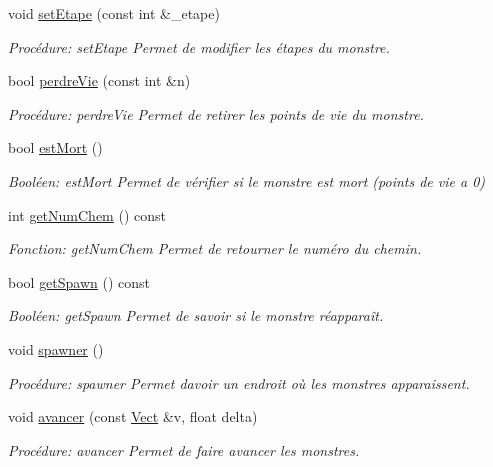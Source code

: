 \begin{DoxyCompactItemize}
void \hyperlink{classMonstre_a51895539b2db4bd6e267e0ac5a1729ce}{set\+Etape} (const int \&\+\_\+etape)
\begin{DoxyCompactList}\small\item\em Procédure\+: set\+Etape Permet de modifier les étapes du monstre. \end{DoxyCompactList}\item 
bool \hyperlink{classMonstre_af6d0a1f276465d12d50db387855e62d3}{perdre\+Vie} (const int \&n)
\begin{DoxyCompactList}\small\item\em Procédure\+: perdre\+Vie Permet de retirer les points de vie du monstre. \end{DoxyCompactList}\item 
bool \hyperlink{classMonstre_aebc60bc5dfa1353663ba975c589dc2e3}{est\+Mort} ()
\begin{DoxyCompactList}\small\item\em Booléen\+: est\+Mort Permet de vérifier si le monstre est mort (points de vie a 0) \end{DoxyCompactList}\item 
int \hyperlink{classMonstre_ac7998eae7604e8bbfb9aad3b3ea59c33}{get\+Num\+Chem} () const
\begin{DoxyCompactList}\small\item\em Fonction\+: get\+Num\+Chem Permet de retourner le numéro du chemin. \end{DoxyCompactList}\item 
bool \hyperlink{classMonstre_a810f2e49356248d02f7b0e9b8ea16d85}{get\+Spawn} () const
\begin{DoxyCompactList}\small\item\em Booléen\+: get\+Spawn Permet de savoir si le monstre réapparaît. \end{DoxyCompactList}\item 
void \hyperlink{classMonstre_a26db17b29af1a99278e7d21bc91f1532}{spawner} ()
\begin{DoxyCompactList}\small\item\em Procédure\+: spawner Permet d\textquotesingle{}avoir un endroit où les monstres apparaissent. \end{DoxyCompactList}\item 
void \hyperlink{classMonstre_a5fed7574a7a621251d313219c0831b09}{avancer} (const \hyperlink{classVect}{Vect} \&v, float delta)
\begin{DoxyCompactList}\small\item\em Procédure\+: avancer Permet de faire avancer les monstres. \end{DoxyCompactList}\item 

\end{DoxyCompactItemize}

